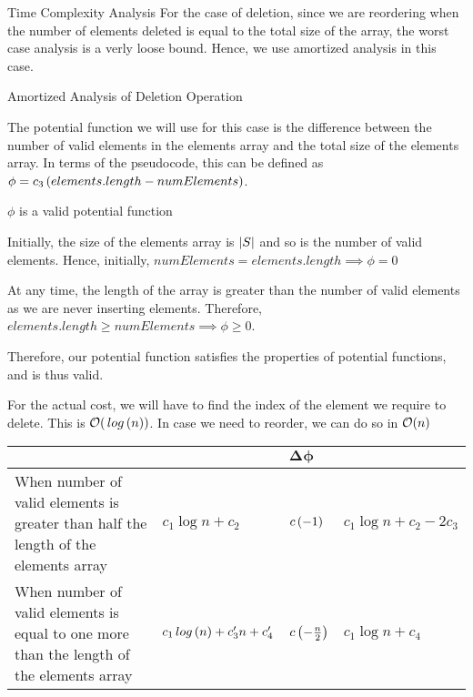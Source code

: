 \documentclass{article}
\begin{document}
\begin{question}
\begin{qsection}{Time Complexity Analysis}
		For the case of deletion, since we are reordering when the number of elements deleted is equal to the total size of the array, the worst case analysis is a verly loose bound. Hence, we use amortized analysis in this case.

		\begin{qsubsection}{Amortized Analysis of Deletion Operation}

			The potential function we will use for this case is the difference between the number of valid elements in the elements array and the total size of the elements array. In terms of the pseudocode, this can be defined as $\phi = c_3 \left( elements.length - numElements \right)$. \br%

			 \br%

			 \br%

			\begin{qproof}{$\phi$ is a valid potential function}

				Initially, the size of the elements array is $\left| {S} \right|$ and so is the number of valid elements. Hence, initially, $numElements = elements.length \implies \phi = 0$ \br%

				At any time, the length of the array is greater than the number of valid elements as we are never inserting elements. Therefore, $elements.length \ge numElements \implies \phi \ge 0$. \br%

				Therefore, our potential function satisfies the properties of potential functions, and is thus valid.

			\end{qproof}

			For the actual cost, we will have to find the index of the element we require to delete. This is $\bigO{\log{n}}$. In case we need to reorder, we can do so in $\mathcal{O}(n)$ \br%


			\begin{table}[h!]
				\centering
				\begin{tabular}{| X{5cm} | X{3cm} | X{3cm} | X{3cm} |}
					\hline
					\bt{Case}	&	\bt{Actual Cost}	&	$\bm{\Delta \phi}$	&	\bt{Amortized Cost} \\
					\hline
					When number of valid elements is greater than half the length of the elements array	&	$c_1 \log{n} + c_2$	&	$c \left( -1 \right)$	&	$c_1 \log{n} + c_2 - 2 c_3$ \\
					\hline
					When number of valid elements is equal to one more than the length of the elements array	&	$c_1 \log{n} + \pr{c_3} n + \pr{c_4}$	&	$c \left( - \frac{n}{2} \right)$	&	$c_1 \log{n} + c_4$ \\
					\hline
				\end{tabular}
			\end{table}


\end{qsubsection}
\end{qsection}
\end{question}
\end{document}
